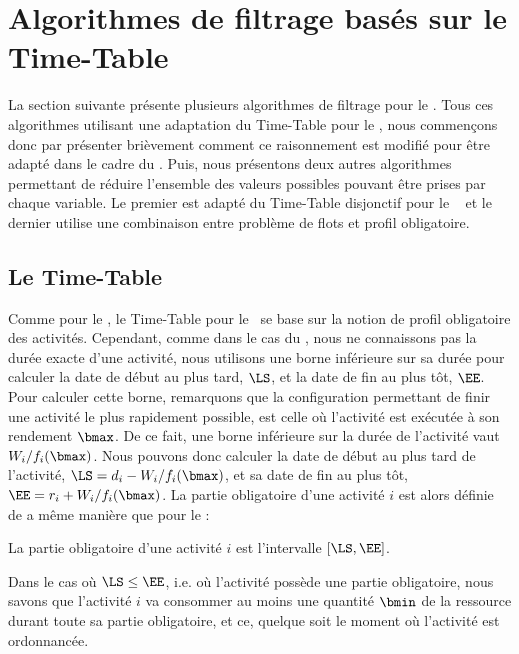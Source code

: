 
\section{Algorithmes de filtrage basés sur le Time-Table}

La section suivante présente plusieurs algorithmes de filtrage pour le
\CECSP. Tous ces algorithmes utilisant une adaptation du Time-Table
pour le \CUSP, nous commençons donc par présenter brièvement comment
ce raisonnement est modifié pour être adapté dans le cadre du \CECSP.
Puis, nous présentons deux autres algorithmes permettant
de réduire l'ensemble des valeurs possibles pouvant être prises par
chaque variable. Le premier est adapté du Time-Table disjonctif pour
le \CUSP~\cite{Gay2015} et le dernier utilise une combinaison entre
problème de flots et profil obligatoire.

\subsection{Le Time-Table}
Comme pour le \CUSP, le Time-Table pour le \CECSP~se base sur la
notion de profil obligatoire des activités. Cependant, comme dans le
cas du \CECSP, nous ne connaissons pas la durée exacte d'une activité,
nous utilisons une borne inférieure sur sa durée pour calculer la date
de début au plus tard, $\LS$, et la date de fin au plus tôt,
$\EE$. Pour calculer cette borne, remarquons que la configuration
permettant de finir une activité le plus rapidement possible, est
celle où l'activité est exécutée à son rendement $\bmax$. De ce fait,
une borne inférieure sur la durée de l'activité vaut
$W_i/f_i(\bmax)$. Nous pouvons donc calculer la date de début au plus
tard de l'activité, $\LS=d_i-W_i/f_i(\bmax)$, et sa date de fin au
plus tôt, $\EE=r_i+W_i/f_i(\bmax)$. La partie obligatoire d'une
activité $i$ est alors définie de a même manière que pour le \CUSP:

\begin{defi}
La partie obligatoire d'une activité $i$ est l'intervalle $[\LS,\EE]$.
\end{defi}

Dans le cas où $\LS \le \EE$, i.e. où l'activité possède une partie
obligatoire, nous savons que l'activité $i$ va consommer au moins une
quantité $\bmin$ de la ressource durant toute sa partie obligatoire,
et ce, quelque soit le moment où l'activité est ordonnancée.

